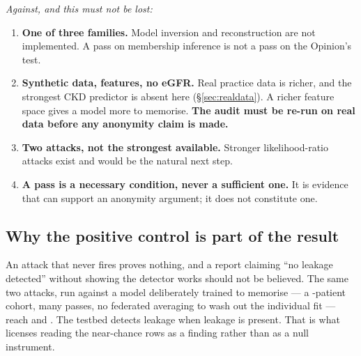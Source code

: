 \emph{Against, and this must not be lost:}

\begin{enumerate}
  \item \textbf{One of three families.} Model inversion and reconstruction are not implemented. A
        pass on membership inference is not a pass on the Opinion's test.
  \item \textbf{Synthetic data, \NumFeatures{} features, no eGFR.} Real practice data is richer, and
        the strongest CKD predictor is absent here (\S\ref{sec:realdata}). A richer feature space
        gives a model more to memorise. \textbf{The audit must be re-run on real data before any
        anonymity claim is made.}
  \item \textbf{Two attacks, not the strongest available.} Stronger likelihood-ratio attacks
        \cite{carlini2022lira} exist and would be the natural next step.
  \item \textbf{A pass is a necessary condition, never a sufficient one.} It is evidence that can
        support an anonymity argument; it does not constitute one.
\end{enumerate}

\subsection{Why the positive control is part of the result}

An attack that never fires proves nothing, and a report claiming ``no leakage detected'' without
showing the detector works should not be believed. The same two attacks, run against a model
deliberately trained to memorise --- a \MIAControlN{}-patient cohort, many passes, no federated
averaging to wash out the individual fit --- reach \MIAControlThreshold{} and \MIAControlShadow{}.
The testbed detects leakage when leakage is present. That is what licenses reading the near-chance
rows as a finding rather than as a null instrument.
